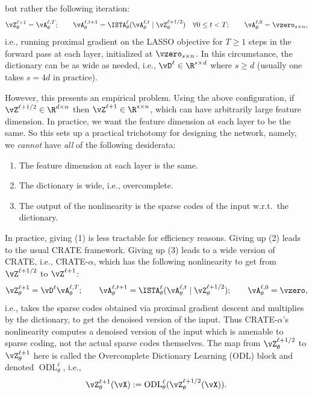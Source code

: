 \documentclass[../../book-main.tex]{subfiles}
\begin{document}
but rather the following iteration:
\begin{equation}
    \vZ_{\theta}^{\ell + 1} = \vA_{\theta}^{\ell, T}; \qquad \vA_{\theta}^{\ell, t + 1} = \ISTA_{\theta}^{\ell}(\vA_{\theta}^{\ell, t} \mid \vZ_{\theta}^{\ell + 1/2}) \quad \forall 0 \leq t < T; \qquad \vA_{\theta}^{\ell, 0} = \vzero_{s \times n},
\end{equation}
i.e., running proximal gradient on the LASSO objective for \(T \geq 1\) steps in the forward pass at each layer, initialized at \(\vzero_{s \times n}\). In this circumstance, the dictionary can be as wide as needed, i.e., \(\vD^{\ell} \in \R^{s \times d}\) where \(s \geq d\) (usually one takes \(s = 4d\) in practice). 

However, this presents an empirical problem. Using the above configuration, if \(\vZ^{\ell + 1/2} \in \R^{d \times n}\) then \(\vZ^{\ell + 1} \in \R^{s \times n}\), which can have arbitrarily large feature dimension. In practice, we want the feature dimension at each layer to be the same. So this sets up a practical trichotomy for designing the network, namely, we \textit{cannot} have \textit{all} of the following desiderata:
\begin{enumerate}
    \item The feature dimension at each layer is the same.
    \item The dictionary is wide, i.e., overcomplete.
    \item The output of the nonlinearity is the sparse codes of the input w.r.t.~the dictionary.
\end{enumerate}
In practice, giving (1) is less tractable for efficiency reasons. Giving up (2) leads to the usual CRATE framework. Giving up (3) leads to a wide version of CRATE, i.e., CRATE-\(\alpha\), which has the following nonlinearity to get from \(\vZ^{\ell + 1/2}\) to \(\vZ^{\ell + 1}\):
\begin{equation}
    \vZ_{\theta}^{\ell + 1} = \vD^{\ell}\vA_{\theta}^{\ell, T}; \qquad \vA_{\theta}^{\ell, t + 1} = \ISTA_{\theta}^{\ell}(\vA_{\theta}^{\ell, t} \mid \vZ_{\theta}^{\ell + 1/2}); \qquad \vA_{\theta}^{\ell, 0} = \vzero,
\end{equation}
i.e., takes the sparse codes obtained via proximal gradient descent and multiplies by the dictionary, to get the denoised version of the input. Thus CRATE-\(\alpha\)'s nonlinearity computes a denoised version of the input which is amenable to sparse coding, not the actual sparse codes themselves. The map from \(\vZ_{\theta}^{\ell + 1/2}\) to \(\vZ_{\theta}^{\ell + 1}\) here is called the Overcomplete Dictionary Learning (ODL) block and denoted \(\operatorname{ODL}_{\theta}^{\ell}\), i.e.,
\begin{equation}
    \vZ_{\theta}^{\ell + 1}(\vX) := \operatorname{ODL}_{\theta}^{\ell}(\vZ_{\theta}^{\ell + 1/2}(\vX)).
\end{equation}
\end{document}
